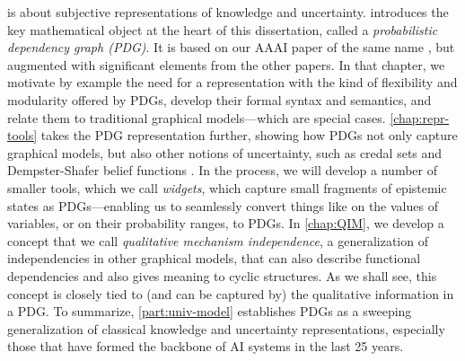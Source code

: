 { is about subjective representations of knowledge and uncertainty. 
%
 introduces the key mathematical object at the heart of this dissertation, called a \emph{probabilistic dependency graph (PDG)}. 
It is based on our AAAI paper of the same name \citep{pdg-aaai}, but augmented with significant elements from the other papers. 
In that chapter, we motivate by example the need for a representation with the kind of flexibility and modularity offered by PDGs, develop their formal syntax and semantics, and relate them to traditional graphical models---which are special cases. 
%
\cref{chap:repr-tools} takes the PDG representation further, showing how PDGs not only capture graphical models, but also other notions of uncertainty, such as credal sets \citep{Walley1991-SRIP} and Dempster-Shafer belief functions \citep{shafer1976mathematical}.  
In the process, we will develop a number of smaller tools, which we call \emph{widgets}, which capture small fragments of epistemic states as PDGs---enabling us to seamlessly convert things like on the values of variables, or on their probability ranges, to PDGs.
In \cref{chap:QIM}, we develop a concept that we call \emph{qualitative mechanism independence}, a generalization of independencies in other graphical models, that can also describe functional dependencies and also gives meaning to cyclic structures. 
As we shall see, this concept is closely tied to (and can be captured by) 
    the qualitative information in a PDG.
%
To summarize, \cref{part:univ-model} establishes PDGs as a sweeping generalization of classical knowledge and uncertainty representations, especially those that have formed the backbone of AI systems in the last 25 years. 


}
